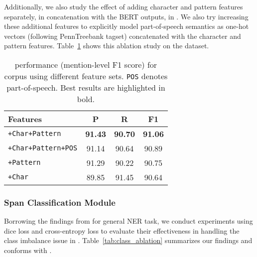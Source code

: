 Additionally, we also study the effect of adding character and pattern features separately, in concatenation with the  BERT outputs, in \spandetect{}. We also try increasing these additional features to explicitly model part-of-speech semantics as one-hot vectors (following PennTreebank tagset) concatenated with the character and pattern features. Table~\ref{tab:feature_ablation} shows this ablation study on the  dataset. 


\begin{table}[h!]
\centering
\begin{small}
\begin{tabular}{lccc}\toprule
Features & P & R & F1 \\ \midrule
\texttt{+Char+Pattern} & \textbf{91.43} & \textbf{90.70} & \textbf{91.06} \\
\texttt{+Char+Pattern+POS} & 91.14 & 90.64 & 90.89 \\
\texttt{+Pattern} & 91.29 &	90.22	& 90.75 \\
\texttt{+Char} & 89.85 &	91.45 &	90.64 \\
\bottomrule
\end{tabular}
\caption{\spandetect{} performance (mention-level F1 score) for  corpus using different feature sets. 
\texttt{POS} denotes part-of-speech. Best results are highlighted in bold.}
\label{tab:feature_ablation}
\end{small}
\end{table}

\subsubsection{Span Classification Module}
Borrowing the findings from \cite{li2019dice} for general NER task, we conduct experiments using dice loss and cross-entropy loss to evaluate their effectiveness in handling the class imbalance issue in \spanclass{}. Table~\ref{tab:class_ablation} summarizes our findings and conforms with \cite{li2019dice}.

